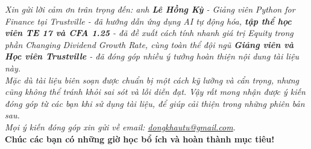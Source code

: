 \documentclass{book}
\begin{document}
\textit{Xin gửi lời cảm ơn trân trọng đến:
 anh \textbf{Lê Hồng Kỳ} - Giảng viên Python for Finance tại Trustville - đã hướng dẫn ứng dụng AI tự động hóa,
 \textbf{tập thể học viên TE 17 và CFA 1.25} - đã đề xuất cách tính nhanh giá trị Equity trong phần Changing Dividend Growth Rate,
 cùng toàn thể đội ngũ \textbf{Giảng viên và Học viên Trustville} - đã đóng góp nhiều ý tưởng hoàn thiện nội dung tài liệu này.
}\\
\textit{Mặc dù tài liệu biên soạn được chuẩn bị một cách kỹ lưỡng và cẩn trọng, nhưng cũng không thể tránh khỏi sai sót và lỗi diễn đạt.
Vậy rất mong nhận được ý kiến đóng góp từ các bạn khi sử dụng tài liệu, để giúp cải thiện trong những phiên bản sau.}\\
\textit{Mọi ý kiến đóng góp xin gửi về email: \href{mailto:dongkhautu@gmail.com}{dongkhautu@gmail.com}}.\\
\textbf{Chúc các bạn có những giờ học bổ ích và hoàn thành mục tiêu!}

\tableofcontents


% 

\begin{appendices}
    
    
    \listoftables
    \listoffigures
\end{appendices}
\end{document}
